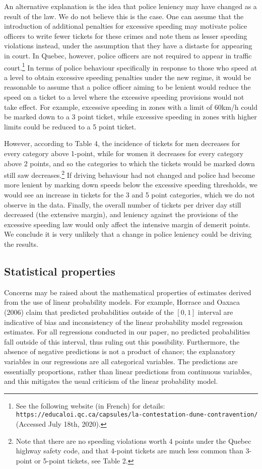 An alternative explanation is the idea that police leniency may have changed as a result of the law. We do not believe this is the case. One can assume that the introduction of additional penalties for excessive speeding may motivate police officers to write fewer tickets for these crimes and note them as lesser speeding violations instead, under the assumption that they have a distaste for appearing in court. In Quebec, however, police officers are not required to appear in traffic court.\footnote{%
See the following website (in French) for details: \texttt{https://educaloi.qc.ca/capsules/la-contestation-dune-contravention/} (Accessed July 18th, 2020).}  
In terms of police behaviour specifically in response to those who speed at a level to obtain excessive speeding penalties under the new regime, it would be reasonable to assume that a police officer aiming to be lenient would reduce the speed on a ticket to a level where the excessive speeding provisions would not take effect. For example, excessive speeding in zones with a limit of 60km/h could be marked down to a 3 point ticket, while excessive speeding in zones with higher limits could be reduced to a 5 point ticket. 

However, according to Table 4, the incidence of tickets for men decreases for every category above 1-point, while for women it decreases for every category above 2 points, and so the categories to which the tickets would be marked down still saw decreases.\footnote{%
Note that there are no speeding violations worth 4 points under the Quebec highway safety code, and that 4-point tickets are much less common than 3-point or 5-point tickets, see Table 2.
}  
If driving behaviour had not changed and police had become more lenient by marking down speeds below the excessive speeding thresholds, we would see an increase in tickets for the 3 and 5 point categories, which we do not observe in the data. Finally, the overall number of tickets per driver day still decreased (the extensive margin), and leniency against the provisions of the excessive speeding law would only affect the intensive margin of demerit points. We conclude it is very unlikely that a change in police leniency could be driving the results.


\subsection{Statistical properties}

Concerns may be raised about the mathematical properties of estimates derived from the use of linear probability models. For example, Horrace and Oaxaca (2006) claim that predicted probabilities outside of the $[0,1]$ interval are indicative of bias and inconsistency of the linear probability model regression estimates. For all regressions conducted in our paper, no predicted probabilities fall outside of this interval, thus ruling out this possibility. Furthermore, the absence of negative predictions is not a product of chance; the explanatory variables in our regressions are all categorical variables. The predictions are essentially proportions, rather than linear predictions from continuous variables, and this mitigates the usual criticism of the linear probability model. 

